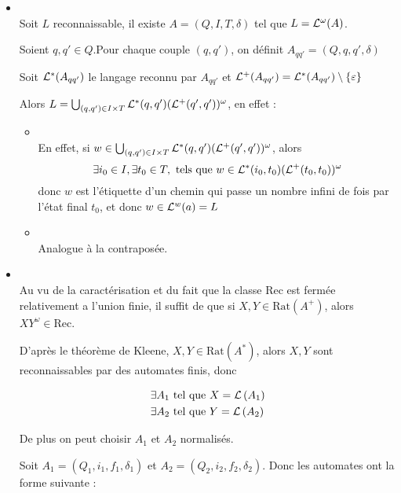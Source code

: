 \begin{proofI}
	\begin{itemize}
		\item \bimpRL \\
		      Soit $L$ reconnaissable, il existe $A = (Q,I,T,\delta)$ tel que $L = \mathcal{L}^{\omega}(A)$.

		      Soient $q,q' \in Q$.Pour chaque couple $(q,q')$, on définit $A_{qq'} = (Q,q,q',\delta)$

		      Soit $\mathcal{L}^*(A_{qq'})$ le langage reconnu par $A_{qq'}$ et $\mathcal{L}^+(A_{qq'}) = \mathcal{L}^*(A_{qq'}) \setminus \left\{\varepsilon\right\}$

		      Alors $L = \bigcup_{(q,q') \in I \times T} \mathcal{L}^*(q,q')(\mathcal{L}^+(q',q'))^{\omega}$, en effet :

		      \begin{itemize}
			      \item \fbox{$\supseteq$} \\
			            En effet, si $w \in \bigcup_{(q,q') \in I \times T} \mathcal{L}^*(q,q')(\mathcal{L}^+(q',q'))^{\omega}$, alors
			            $$\exists i_0 \in I, \exists t_0 \in T, \text{ tels que } w \in \mathcal{L}^*(i_0,t_0)(\mathcal{L}^+(t_0,t_0))^{\omega}$$
			            donc $w$ est l'étiquette d'un chemin qui passe un nombre infini de fois par l'état final $t_0$, et donc
			            $w\in \mathcal{L}^w (a) = L$
			      \item \fbox{$\subseteq$} \\
			            Analogue à la contraposée.
		      \end{itemize}

		\item \bimpLR \\
		      Au vu de la caractérisation et du fait que la classe Rec est fermée relativement a l'union finie, il suffit de \mq que si
		      $X,Y \in \text{Rat}(A^+)$, alors $XY^{\omega} \in \text{Rec}$.

		      D'après le théorème de Kleene, $X,Y \in \text{Rat} (A^*)$, alors $X,Y$ sont reconnaissables par des automates finis, donc

		      \begin{eqnarray*}
			      &\exists A_1 \text{ tel que } X = \mathcal{L}\left(A_1\right) \\
			      &\exists A_2 \text{ tel que } Y = \mathcal{L}\left(A_2\right)
		      \end{eqnarray*}

		      De plus on peut choisir $A_1$ et $A_2$ normalisés.

		      Soit $A_1 = (Q_1, i_1, f_1, \delta_1)$ et $A_2 = (Q_2, i_2, f_2, \delta_2)$.
		      Donc les automates ont la forme suivante :
\end{itemize}
\end{proofI}
